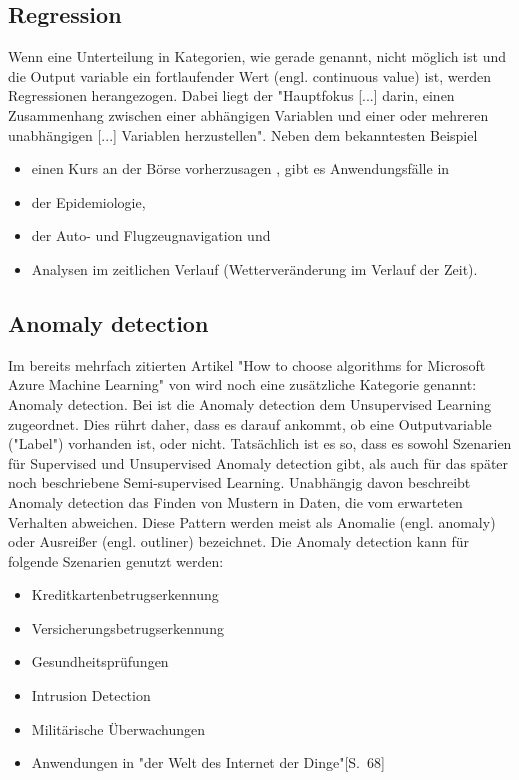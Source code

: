 \subsection{Regression}\label{subsubsec:regression}
Wenn eine Unterteilung in Kategorien, wie gerade genannt, nicht möglich ist und die Output variable ein fortlaufender Wert (engl. continuous value) ist, werden Regressionen herangezogen. Dabei liegt der "Hauptfokus [...] darin, einen Zusammenhang zwischen einer abhängigen Variablen und einer oder mehreren unabhängigen [...] Variablen herzustellen"\citep[S.~60; eigene Übersetzung]{swamynathan_mastering_2017}. Neben dem bekanntesten Beispiel
\begin{itemize}
\item einen Kurs an der Börse vorherzusagen , gibt es Anwendungsfälle in
\item der Epidemiologie,
\item der Auto- und Flugzeugnavigation und
\item Analysen im zeitlichen Verlauf (Wetterveränderung im Verlauf der Zeit)\citep[S.~5]{kauchak_zoterovoll2.pdf_2016}.
\end{itemize}

\subsection{Anomaly detection}
Im bereits mehrfach zitierten Artikel "How to choose algorithms for Microsoft Azure Machine Learning" von \citep{ericson_how_2017} wird noch eine zusätzliche Kategorie genannt: Anomaly detection. Bei \citep[S.~68]{swamynathan_mastering_2017} ist die Anomaly detection dem Unsupervised Learning zugeordnet. Dies rührt daher, dass es darauf ankommt, ob eine Outputvariable ("Label") vorhanden ist, oder nicht. Tatsächlich ist es so, dass es sowohl Szenarien für Supervised und Unsupervised Anomaly detection gibt, als auch für das später noch beschriebene Semi-supervised Learning.\citep[S.~15:10]{chandola_anomaly_2009}
Unabhängig davon beschreibt Anomaly detection das Finden von Mustern in Daten, die vom erwarteten Verhalten abweichen. Diese Pattern werden meist als Anomalie (engl. anomaly) oder Ausreißer (engl. outliner) bezeichnet.\citep[S.~15:1]{chandola_anomaly_2009}
Die Anomaly detection kann für folgende Szenarien genutzt werden\citep[S.~15:2]{chandola_anomaly_2009}:
\begin{itemize}
\item Kreditkartenbetrugserkennung
\item Versicherungsbetrugserkennung
\item Gesundheitsprüfungen
\item Intrusion Detection
\item Militärische Überwachungen
\item Anwendungen in "der Welt des Internet der Dinge"[S.~68]\citep{swamynathan_mastering_2017}
\end{itemize}

